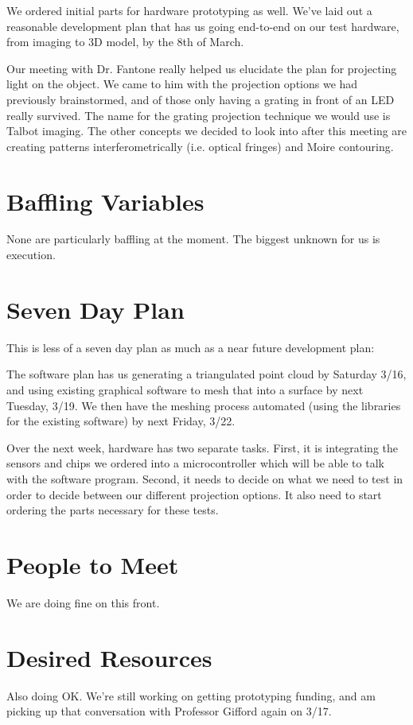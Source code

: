 \documentclass[10pt]{article}
\begin{document}
We ordered initial parts for hardware prototyping as well. We've laid out a
reasonable development plan that has us going end-to-end on our test hardware,
from imaging to 3D model, by the 8th of March.

Our meeting with Dr. Fantone really helped us elucidate the plan for projecting
light on the object. We came to him with the projection options we had
previously brainstormed, and of those only having a grating in front of an LED
really survived. The name for the grating projection technique we would use is
Talbot imaging.  The other concepts we decided to look into after this meeting
are creating patterns interferometrically (i.e. optical fringes) and Moire
contouring. 

\section{Baffling Variables}
None are particularly baffling at the moment. The biggest unknown for us is execution.

\section{Seven Day Plan}
This is less of a seven day plan as much as a near future development plan:

The software plan has us generating a triangulated point cloud by Saturday 3/16, and
using existing graphical software to mesh that into a surface by next Tuesday, 3/19. We
then have the meshing process automated (using the libraries for the existing
software) by next Friday, 3/22.

Over the next week, hardware has two separate tasks. First, it is integrating the sensors and chips we
ordered into a microcontroller which will be able to talk with the software
program.  Second, it needs to decide on what we need to test in order to decide
between our different projection options. It also need to start ordering the
 parts necessary for these tests.

\section{People to Meet}
We are doing fine on this front.

\section{Desired Resources}
Also doing OK. We're still working on getting prototyping funding, and am
picking up that conversation with Professor Gifford again on 3/17.
\end{document}
